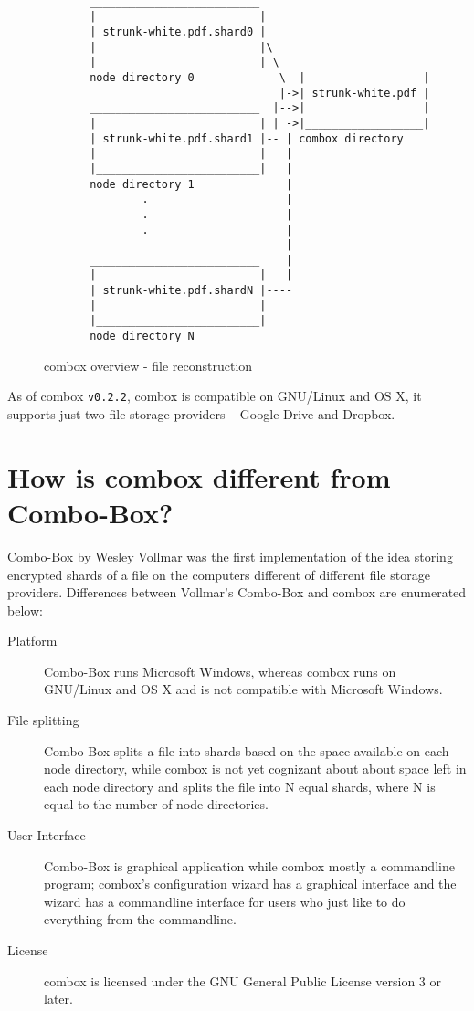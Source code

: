 \begin{figure}[h]
\begin{verbatim}

       __________________________
       |                         |
       | strunk-white.pdf.shard0 |
       |                         |\
       |_________________________| \   ___________________
       node directory 0             \  |                  |
                                    |->| strunk-white.pdf |
       __________________________  |-->|                  |
       |                         | | ->|__________________|
       | strunk-white.pdf.shard1 |-- | combox directory
       |                         |   |
       |_________________________|   |
       node directory 1              |
               .                     |
               .                     |
               .                     |
                                     |
       __________________________    |
       |                         |   |
       | strunk-white.pdf.shardN |----
       |                         |
       |_________________________|
       node directory N

\end{verbatim}
\caption{combox overview - file reconstruction}
\label{fig:1-combox-overview-1}
\end{figure}

As of combox \verb+v0.2.2+, combox is compatible on GNU/Linux and OS
X, it supports just two file storage providers -- Google Drive and
Dropbox.

\section{How is combox different from Combo-Box?}\label{1-sec-cb-diff}

Combo-Box by Wesley Vollmar\cite{vollman-combo-box} was the first
implementation of the idea storing encrypted shards of a file on the
computers different of different file storage providers. Differences
between Vollmar's Combo-Box and combox are enumerated below:

\begin{description}
\item[Platform] Combo-Box runs Microsoft Windows, whereas combox runs
  on GNU/Linux and OS X and is not compatible with Microsoft Windows.
\item[File splitting] Combo-Box splits a file into shards based on the
  space available on each node directory\cite{vollmar-combo-box},
  while combox is not yet cognizant about about space left in each
  node directory and splits the file into N equal shards, where N is
  equal to the number of node directories.
\item[User Interface] Combo-Box is graphical application while combox
  mostly a commandline program; combox's configuration wizard has a
  graphical interface and the wizard has a commandline interface for
  users who just like to do everything from the commandline.
\item[License] combox is licensed under the GNU General Public License
  version 3 or later.
\end{description}

